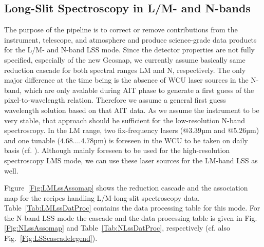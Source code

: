 \subsection{Long-Slit Spectroscopy in L/M- and N-bands}

The purpose of the pipeline is to correct or remove contributions from
the instrument, telescope, and atmosphere and produce science-grade
data products for the L/M- and N-band \ac{LSS}
mode. Since the detector properties are not fully specified, especially of the new Geosnap, we currently assume
basically same reduction cascade for both spectral ranges LM and
N, respectively. The only major difference at the time being is the absence of \ac{WCU} laser sources in the N-band, which are only avalable during \ac{AIT} phase to generate a first guess of the pixel-to-wavelength relation. Therefore we assume a general first guess wavelength solution based on that \ac{AIT} data. As we assume the instrument to be very stable, that approach should be sufficient for the low-resolution N-band spectroscopy. In the LM range, two fix-frequency lasers ($@3.39$µm and $@5.26$µm) and one tunable ($4.68....4.78$µm) is foreseen in the \ac{WCU} to be taken on daily basis (cf. \cite{METIS-calibration_plan}). Although mainly foreseen to be used for the high-resolution spectroscopy \ac{LMS} mode, we can use these laser sources for the LM-band \ac{LSS} as well.


Figure~\ref{Fig:LMLssAssomap} shows the reduction cascade and the association map for the recipes handling L/M-long-slit
spectroscopy data.  Table~\ref{Tab:LMLssDatProc} contains the data processing table for this mode. For the N-band \ac{LSS} mode the cascade and the data processing table is given in Fig.\ref{Fig:NLssAssomap} and Table~\ref{Tab:NLssDatProc}, respectively (cf. also Fig.~\ref{Fig:LSScascadelegend}).


